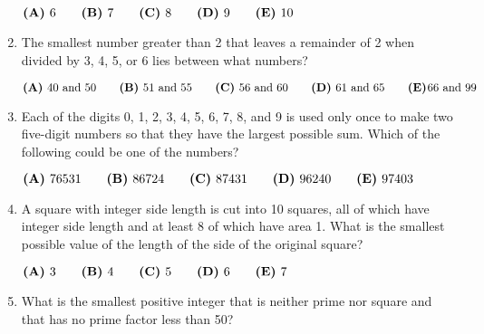 \documentclass{article}
\begin{document}
\begin{enumerate}[label=\arabic*., itemsep=0.5em]
\( \textbf{(A)}\hspace{.05in}6\qquad\textbf{(B)}\hspace{.05in}7\qquad\textbf{(C)}\hspace{.05in}8\qquad\textbf{(D)}\hspace{.05in}9\qquad\textbf{(E)}\hspace{.05in}10 \)\par \vspace{0.5em}\item The smallest number greater than 2 that leaves a remainder of 2 when divided by 3, 4, 5, or 6 lies between what numbers?

\( \textbf{(A)}\hspace{.05in}40\text{ and }50\qquad\textbf{(B)}\hspace{.05in}51\text{ and }55\qquad\textbf{(C)}\hspace{.05in}56\text{ and }60\qquad\textbf{(D)}\hspace{.05in}\text{61 and 65}\qquad\textbf{(E)}\hspace{.01in}\text{66 and 99} \)\par \vspace{0.5em}\item Each of the digits 0, 1, 2, 3, 4, 5, 6, 7, 8, and 9 is used only once to make two five-digit numbers so that they have the largest possible sum. Which of the following could be one of the numbers?

\( \textbf{(A)}\hspace{.05in}76531\qquad\textbf{(B)}\hspace{.05in}86724\qquad\textbf{(C)}\hspace{.05in}87431\qquad\textbf{(D)}\hspace{.05in}96240\qquad\textbf{(E)}\hspace{.05in}97403 \)\par \vspace{0.5em}\item A square with integer side length is cut into 10 squares, all of which have integer side length and at least 8 of which have area 1. What is the smallest possible value of the length of the side of the original square?

\( \textbf{(A)}\hspace{.05in}3\qquad\textbf{(B)}\hspace{.05in}4\qquad\textbf{(C)}\hspace{.05in}5\qquad\textbf{(D)}\hspace{.05in}6\qquad\textbf{(E)}\hspace{.05in}7 \)\par \vspace{0.5em}\item What is the smallest positive integer that is neither prime nor square and that has no prime factor less than 50?


\end{enumerate}
\end{document}
